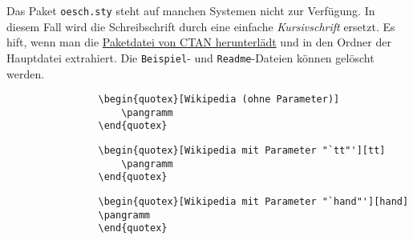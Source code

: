 			\begin{redbox}
				Das Paket \texttt{oesch.sty} steht auf manchen Systemen nicht zur Verfügung. In diesem Fall wird die {\oeschfamily Schreibschrift} durch eine einfache \emph{Kursivschrift} ersetzt. Es hift, wenn man die \href{https://www.ctan.org/tex-archive/fonts/oesch?lang=de}{Paketdatei von CTAN herunterlädt} und in den Ordner der Hauptdatei extrahiert. Die \texttt{Beispiel}- und \texttt{Readme}-Dateien können gelöscht werden.
			\end{redbox}
			
			
			\begin{verbatim}
				\begin{quotex}[Wikipedia (ohne Parameter)] 
				    \pangramm
				\end{quotex}
			\end{verbatim}
			
			
			\begin{verbatim}
				\begin{quotex}[Wikipedia mit Parameter "`tt"'][tt] 
				    \pangramm
				\end{quotex}
			\end{verbatim}
			
			
			\begin{verbatim}
				\begin{quotex}[Wikipedia mit Parameter "`hand"'][hand]
				\pangramm
				\end{quotex}
			\end{verbatim}
			
			
